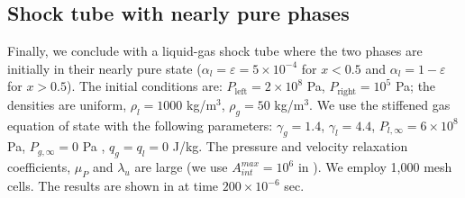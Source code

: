 \subsection{Shock tube with nearly pure phases}\label{sec:third-test}
%
%
Finally, we conclude with a liquid-gas shock tube where the two phases are initially in their nearly pure state 
($\alpha_l = \varepsilon = 5\times 10^{-4}$ for $x<0.5$ and $\alpha_l = 1- \varepsilon $ for $x>0.5$). 
The initial conditions are: $P_{\text{left}}=2\times 10^8$ Pa, $P_{\text{right}}=10^5$ Pa; 
the densities are uniform, $\rho_l = 1000$ kg/m$^3$,  $\rho_g = 50$ kg/m$^3$.  We use the stiffened gas equation of state with the 
following parameters: $\gamma_g=1.4$, $\gamma_l=4.4$, $P_{l,\infty}=6\times 10^8$ Pa, $P_{g,\infty}=0$ Pa , $q_g=q_l=0$ J/kg. The pressure
and velocity relaxation coefficients, $\mu_P$ and $\lambda_u$ are large (we use $A_{int}^{max}=10^6$ in ).
We employ 1,000 mesh cells. The results are shown in  at time $200\times 10 ^{-6}$ sec. 


